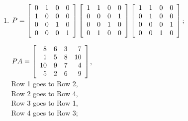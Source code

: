 
\begin{enumerate}[!HW!, start=1]
\begin{multicols}{3}
\itemspade $\mtx{rr}{2&4\\3&-2\\-3&-15}$
\itemspade $\mtx{rrr}{-9&6&18\\0&5&-50\\12&4&12}$
\itemspade $\mtx{rrr}{0&6&0\\0&0&0\\0&15&-25}$ 
\end{multicols}

\itemspade $A^2= \mtx{ccc}{4&0&0\\0&9&0\\0&0&25},\ A^3= \mtx{ccc}{8&0&0\\0&-27&0\\0&0&125},\ A^{-1}= \mtx{ccc}{1/2&0&0\\0&-1/3&0\\0&0&1/5}, \ A^{-3}= \mtx{ccc}{1/8&0&0\\0&-1/27&0\\0&0&1/125}$

\item $P=\mtx{rrrr}{0&1&0&0\\1&0&0&0\\0&0&1&0\\0&0&0&1}\mtx{rrrr}{1&1&0&0\\0&0&0&1\\0&0&1&0\\0&1&0&0}\mtx{rrrr}{1&1&0&0\\0&1&0&0\\0&0&0&1\\0&0&1&0}$;\\
\begin{multicols}{2}$PA = \mtx{rrrr}{8&6&3&7\\1&5&8&10\\10&9&7&4\\5&2&6&9}$,\\ Row 1 goes to Row 2,\\ Row 2 goes to Row 4,\\ Row 3 goes to Row 1,\\ Row 4 goes to Row 3;\columnbreak


\end{multicols}
\end{enumerate}

